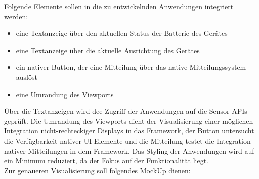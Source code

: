 \documentclass[a4paper]{scrartcl}
\begin{document}
Folgende Elemente sollen in die zu entwickelnden Anwendungen integriert werden:

\begin{itemize}
	\item eine Textanzeige über den aktuellen Status der Batterie des Gerätes
	\item eine Textanzeige über die aktuelle Ausrichtung des Gerätes
	\item ein nativer Button, der eine Mitteilung über das native Mitteilungssystem auslöst 
	\item eine Umrandung des Viewports
\end{itemize}

Über die Textanzeigen wird dee Zugriff der Anwendungen auf die Sensor-APIs geprüft. Die Umrandung des Viewports dient der Visualisierung einer möglichen Integration nicht-rechteckiger Displays in das Framework, der Button untersucht die Verfügbarkeit nativer UI-Elemente und die Mitteilung testet die Integration nativer Mitteilungen in dem Framework. Das Styling der Anwendungen wird auf ein Minimum reduziert, da der Fokus auf der Funktionalität liegt. \\
Zur genaueren Visualisierung soll folgendes MockUp dienen:
\end{document}

